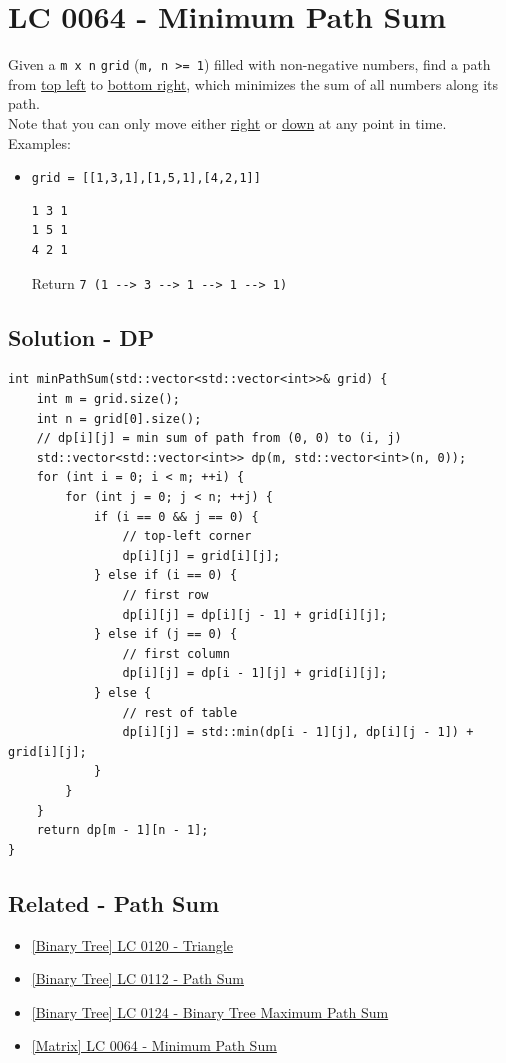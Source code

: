 \section{LC 0064 - Minimum Path Sum}\label{lc0064}
Given a {\colorbox{CodeBackground}{\lstinline|m x n|}} {\colorbox{CodeBackground}{\lstinline|grid|}} ({\colorbox{CodeBackground}{\lstinline|m, n >= 1|}}) filled with non-negative numbers, find a path from \ul{top left} to \ul{bottom right}, which minimizes the sum of all numbers along its path.\\

Note that you can only move either \ul{right} or \ul{down} at any point in time.\\

Examples:
\begin{itemize}
\item {\colorbox{CodeBackground}{\lstinline|grid = [[1,3,1],[1,5,1],[4,2,1]]|}}
\begin{lstlisting}
1 3 1
1 5 1
4 2 1
\end{lstlisting}
Return {\colorbox{CodeBackground}{\lstinline|7 (1 --> 3 --> 1 --> 1 --> 1)|}}
\end{itemize}

\subsection*{Solution - DP}
\begin{lstlisting}
int minPathSum(std::vector<std::vector<int>>& grid) {
	int m = grid.size();
	int n = grid[0].size();
	// dp[i][j] = min sum of path from (0, 0) to (i, j)
	std::vector<std::vector<int>> dp(m, std::vector<int>(n, 0));
	for (int i = 0; i < m; ++i) {
		for (int j = 0; j < n; ++j) {
			if (i == 0 && j == 0) {
				// top-left corner
				dp[i][j] = grid[i][j];
			} else if (i == 0) {
				// first row
				dp[i][j] = dp[i][j - 1] + grid[i][j];
			} else if (j == 0) {
				// first column
				dp[i][j] = dp[i - 1][j] + grid[i][j];
			} else {
				// rest of table
				dp[i][j] = std::min(dp[i - 1][j], dp[i][j - 1]) + grid[i][j];
			}
		}
	}
	return dp[m - 1][n - 1];
}
\end{lstlisting}

\subsection*{Related - Path Sum}
\begin{itemize}
	\item \hyperref[lc0120]{[Binary Tree] LC 0120 - Triangle}
	\item \hyperref[lc0112]{[Binary Tree] LC 0112 - Path Sum}
	\item \hyperref[lc0124]{[Binary Tree] LC 0124 - Binary Tree Maximum Path Sum}
	\item \hyperref[lc0064]{[Matrix] LC 0064 - Minimum Path Sum}
\end{itemize}

